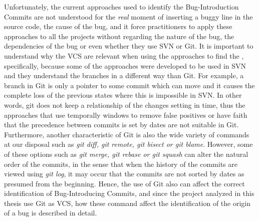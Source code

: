 \documentclass[a4paper, 12pt]{book}
\begin{document}
Unfortunately, the current approaches used to identify the Bug-Introduction Commits are not understood for the \emph{real} moment of inserting a buggy line in the source code, the cause of the bug, and it force practitioners to apply these approaches to all the projects without regarding the nature of the bug, the dependencies of the bug or even whether they use SVN or Git. It is important to understand why the VCS are relevant when using the approaches to find the \BIC, specifically, because some of the approaches were developed to be used in SVN and they understand the branches in a different way than Git. For example, a branch in Git is only a pointer to some commit which can move and it causes the complete loss of the previous states where this is impossible in SVN. In other words, git does not keep a relationship of the changes setting in time, thus the approaches that use temporally windows to remove false positives or have faith that the precedence between commits is set by dates are not suitable in Git. Furthermore, another characteristic of Git is also the wide variety of commands at our disposal such as \emph{git diff, git remote, git bisect or git blame}. However, some of these options such as \emph{git merge, git rebase or git squash} can alter the natural order of the commits, in the sense that when the history of the commits are viewed using \emph{git log}, it may occur that the commits are not sorted by dates as presumed from the beginning. Hence, the use of Git also can affect the correct identification of Bug-Introducing Commits, and since the project analyzed in this thesis use Git as VCS, how these command affect the identification of the origin of a bug is described in detail. %

\end{document}
